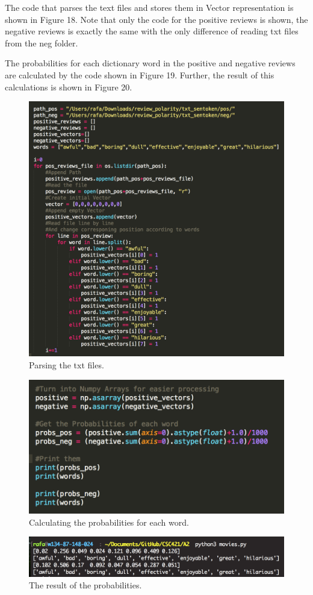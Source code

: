 \documentclass[12pt, letter]{article}
\begin{document}
The code that parses the text files and stores them in Vector representation is shown in Figure 18. Note that only the code for the positive reviews is shown, the negative reviews is exactly the same with the only difference of reading txt files from the neg folder. 

The probabilities for each dictionary word in the positive and negative reviews are calculated by the code shown in Figure 19. Further, the result of this calculations is shown in Figure 20. 


 \begin{figure}[htb]
  \centering
  \includegraphics[width=0.7 \textwidth]{./figures/parsing.png}
  \caption{Parsing the txt files.}
\end{figure}

 \begin{figure}[htb]
  \centering
  \includegraphics[width=0.7 \textwidth]{./figures/probs.png}
  \caption{Calculating the probabilities for each word.}
\end{figure}

 \begin{figure}[htb]
  \centering
  \includegraphics[width=0.7 \textwidth]{./figures/probs_print.png}
  \caption{The result of the probabilities.}
\end{figure}
\end{document}
